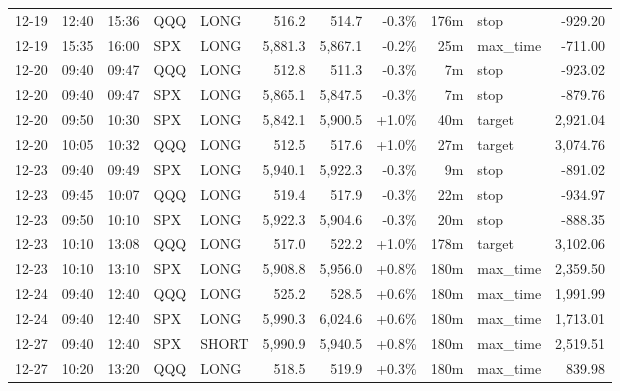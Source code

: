 \documentclass[11pt,a4paper,twoside]{article}
\begin{document}
\begin{center}
\begin{longtable}{>{\color{txtmain}}l l l l l r r r r >{\color{txtmain}}l r}
12-19 & 12:40 & 15:36 & QQQ & LONG & 516.2 & 514.7 & \textcolor{lossred}{-0.3\%} & 176m & stop & \textcolor{lossred}{-929.20} \\
12-19 & 15:35 & 16:00 & SPX & LONG & 5,881.3 & 5,867.1 & \textcolor{lossred}{-0.2\%} & 25m & max\_time & \textcolor{lossred}{-711.00} \\
12-20 & 09:40 & 09:47 & QQQ & LONG & 512.8 & 511.3 & \textcolor{lossred}{-0.3\%} & 7m & stop & \textcolor{lossred}{-923.02} \\
12-20 & 09:40 & 09:47 & SPX & LONG & 5,865.1 & 5,847.5 & \textcolor{lossred}{-0.3\%} & 7m & stop & \textcolor{lossred}{-879.76} \\
12-20 & 09:50 & 10:30 & SPX & LONG & 5,842.1 & 5,900.5 & \textcolor{wingreen}{+1.0\%} & 40m & target & \textcolor{wingreen}{2,921.04} \\
12-20 & 10:05 & 10:32 & QQQ & LONG & 512.5 & 517.6 & \textcolor{wingreen}{+1.0\%} & 27m & target & \textcolor{wingreen}{3,074.76} \\
12-23 & 09:40 & 09:49 & SPX & LONG & 5,940.1 & 5,922.3 & \textcolor{lossred}{-0.3\%} & 9m & stop & \textcolor{lossred}{-891.02} \\
12-23 & 09:45 & 10:07 & QQQ & LONG & 519.4 & 517.9 & \textcolor{lossred}{-0.3\%} & 22m & stop & \textcolor{lossred}{-934.97} \\
12-23 & 09:50 & 10:10 & SPX & LONG & 5,922.3 & 5,904.6 & \textcolor{lossred}{-0.3\%} & 20m & stop & \textcolor{lossred}{-888.35} \\
12-23 & 10:10 & 13:08 & QQQ & LONG & 517.0 & 522.2 & \textcolor{wingreen}{+1.0\%} & 178m & target & \textcolor{wingreen}{3,102.06} \\
12-23 & 10:10 & 13:10 & SPX & LONG & 5,908.8 & 5,956.0 & \textcolor{wingreen}{+0.8\%} & 180m & max\_time & \textcolor{wingreen}{2,359.50} \\
12-24 & 09:40 & 12:40 & QQQ & LONG & 525.2 & 528.5 & \textcolor{wingreen}{+0.6\%} & 180m & max\_time & \textcolor{wingreen}{1,991.99} \\
12-24 & 09:40 & 12:40 & SPX & LONG & 5,990.3 & 6,024.6 & \textcolor{wingreen}{+0.6\%} & 180m & max\_time & \textcolor{wingreen}{1,713.01} \\
12-27 & 09:40 & 12:40 & SPX & SHORT & 5,990.9 & 5,940.5 & \textcolor{wingreen}{+0.8\%} & 180m & max\_time & \textcolor{wingreen}{2,519.51} \\
12-27 & 10:20 & 13:20 & QQQ & LONG & 518.5 & 519.9 & \textcolor{wingreen}{+0.3\%} & 180m & max\_time & \textcolor{wingreen}{839.98} \\

\end{longtable}
\end{center}
\end{document}
